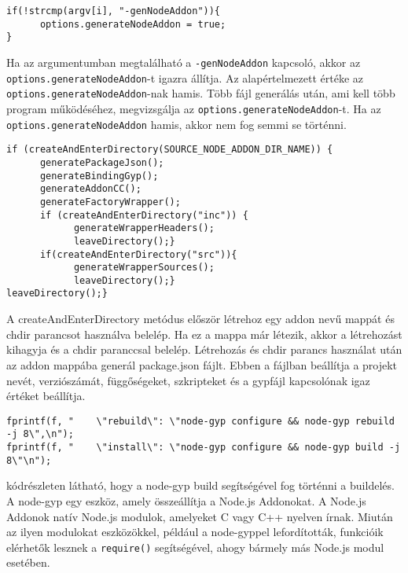 \begin{lstlisting}[caption={SchemaGenerator kapcsoló vizsgálás},label={lst:schemagenerator_argv_genNodeAddon}, language={CStyle}]
if(!strcmp(argv[i], "-genNodeAddon")){
      options.generateNodeAddon = true;
}
\end{lstlisting}

Ha az argumentumban megtalálható a \texttt{-genNodeAddon} kapcsoló, akkor az \texttt{options.generateNodeAddon}-t igazra állítja.
Az alapértelmezett értéke az \texttt{options.generateNodeAddon}-nak hamis.
Több fájl generálás után, ami kell több program működéséhez, megvizsgálja az \texttt{options.generateNodeAddon}-t.
Ha az \texttt{options.generateNodeAddon} hamis, akkor nem fog semmi se történni.

\begin{lstlisting}[caption={SchemaGenerator JavaScriptAddon generálás},label={lst:schemagenerator_genNodeAddon_check}, language={CStyle}]
if (createAndEnterDirectory(SOURCE_NODE_ADDON_DIR_NAME)) {
      generatePackageJson();
      generateBindingGyp();
      generateAddonCC();
      generateFactoryWrapper();
      if (createAndEnterDirectory("inc")) {
            generateWrapperHeaders();
            leaveDirectory();}
      if(createAndEnterDirectory("src")){
            generateWrapperSources();
            leaveDirectory();}
leaveDirectory();}
\end{lstlisting}

A createAndEnterDirectory metódus először létrehoz egy addon nevű mappát és chdir parancsot használva belelép.
Ha ez a mappa már létezik, akkor a létrehozást kihagyja és a chdir paranccsal belelép.
Létrehozás és chdir parancs használat után az addon mappába generál package.json fájlt.
Ebben a fájlban beállítja a projekt nevét, verziószámát, függőségeket, szkripteket és a gypfájl kapcsolónak igaz értéket beállítja.

\begin{lstlisting}[caption={NodeAddonGenerator package.json szkriptek}, label={lst:nodeAddonGenerator_package_json}, language={CStyle}]
fprintf(f, "    \"rebuild\": \"node-gyp configure && node-gyp rebuild -j 8\",\n");
fprintf(f, "    \"install\": \"node-gyp configure && node-gyp build -j 8\"\n");
\end{lstlisting}

 kódrészleten látható, hogy a node-gyp build segítségével fog történni a buildelés.
A node-gyp egy eszköz, amely összeállítja a Node.js Addonokat. A Node.js Addonok natív Node.js modulok, amelyeket C vagy C++ nyelven írnak.
Miután az ilyen modulokat eszközökkel, például a node-gyppel lefordították, funkcióik elérhetők lesznek a \texttt{require()} segítségével, ahogy bármely más Node.js modul esetében.

